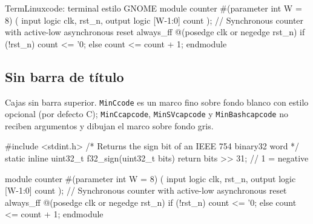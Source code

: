\begin{codigo}
\begin{TermLinuxcode}{TermLinuxcode: terminal estilo GNOME}
module counter #(parameter int W = 8) (
  input  logic         clk, rst_n,
  output logic [W-1:0] count
);
  // Synchronous counter with active-low asynchronous reset
  always_ff @(posedge clk or negedge rst_n)
    if (!rst_n) count <= '0;
    else        count <= count + 1;
endmodule
\end{TermLinuxcode}
\caption{Ejemplo con \texttt{TermLinuxcode} y estilo \texttt{caja\_sv\_dark}.}
\label{lst:ej-termlinux}
\end{codigo}

\subsection{Sin barra de título}
\label{subsec:ej-code-sinbarra}

Cajas sin barra superior. \texttt{MinCcode} es un marco fino sobre fondo blanco con estilo opcional (por defecto C); \texttt{MinCcapcode}, \texttt{MinSVcapcode} y \texttt{MinBashcapcode} no reciben argumentos y dibujan el marco sobre fondo gris.

\begin{codigo}
\caption{Ejemplo con \texttt{MinCcode} (estilo por defecto \texttt{caja\_c}).}
\label{lst:ej-minc}
\end{codigo}

\begin{codigo}
\begin{MinCcapcode}
#include <stdint.h>
/* Returns the sign bit of an IEEE 754 binary32 word */
static inline uint32_t f32_sign(uint32_t bits) {
    return bits >> 31;   // 1 = negative
}
\end{MinCcapcode}
\caption{Ejemplo con \texttt{MinCcapcode}.}
\label{lst:ej-mincap-c}
\end{codigo}

\begin{codigo}
\begin{MinSVcapcode}
module counter #(parameter int W = 8) (
  input  logic         clk, rst_n,
  output logic [W-1:0] count
);
  // Synchronous counter with active-low asynchronous reset
  always_ff @(posedge clk or negedge rst_n)
    if (!rst_n) count <= '0;
    else        count <= count + 1;
endmodule
\end{MinSVcapcode}
\caption{Ejemplo con \texttt{MinSVcapcode}.}
\label{lst:ej-mincap-sv}
\end{codigo}

